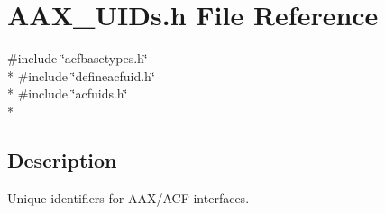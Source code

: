 \hypertarget{a00299}{}\section{A\+A\+X\+\_\+\+U\+I\+Ds.\+h File Reference}
\label{a00299}
{\ttfamily \#include \char`\"{}acfbasetypes.\+h\char`\"{}}\\*
{\ttfamily \#include \char`\"{}defineacfuid.\+h\char`\"{}}\\*
{\ttfamily \#include \char`\"{}acfuids.\+h\char`\"{}}\\*


\subsection{Description}
Unique identifiers for A\+A\+X/\+A\+C\+F interfaces. 

